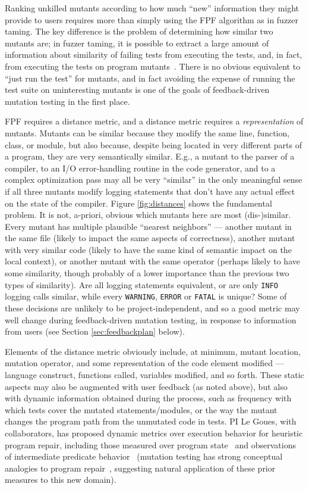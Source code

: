 Ranking unkilled mutants according to how much ``new'' information they might
provide to users requires more than simply using the FPF algorithm as
in fuzzer taming.  The key difference is the problem of determining
how similar two mutants are; in fuzzer taming, it is possible to
extract a large amount of information about similarity of failing
tests from executing the tests, and, in fact, from executing the tests
on program mutants~\cite{PLDI13,distMut}.  There is no obvious
equivalent to
``just run the test'' for mutants, and in fact avoiding the expense of running
the test suite on uninteresting mutants is one of the goals of
feedback-driven mutation testing in the first place.

FPF requires a distance metric, and a distance metric requires a
\emph{representation} of mutants.  Mutants can be similar because they
modify the same line, function, class, or module, but also because,
despite being located in very different parts of a program, they are
very semantically similar.  E.g., a mutant to the parser of a compiler, to
an I/O error-handling routine in the code generator, and to a complex
optimization pass may all be very ``similar'' in the only meaningful
sense if all three mutants modify logging statements that don't have
any actual effect on the state of the compiler.  Figure
\ref{fig:distances} shows the fundamental problem.  It is not,
a-priori, obvious which mutants here are most (dis-)similar.  Every
mutant has multiple plausible ``nearest neighbors'' --- another mutant
in the same file (likely to impact the same aspects of correctness),
another mutant with very similar code (likely to have the same kind of
semantic impact on the local context), or another mutant with the same operator (perhaps
likely to have some similarity, though probably of a lower importance
than the previous two types of similarity).  Are all logging statements
equivalent, or are only {\tt INFO} logging calls similar, while every
{\tt WARNING}, {\tt ERROR} or {\tt FATAL} is unique?  Some of these
decisions are unlikely to be project-independent, and so a good metric
may well change during feedback-driven mutation testing, in response
to information from users (see Section \ref{sec:feedbackplan} below).

Elements of the
distance metric obviously include, at minimum, mutant location, mutation operator, and
some representation of the code element modified --- language
construct, functions called, variables modified, and so forth.  These
static aspects may also be augmented with user feedback (as noted
above), but also with dynamic information obtained during the process,
such as frequency with which tests cover the mutated
statements/modules, or the way the mutant changes the
program path from the unmutated code in tests.  PI Le Goues, with collaborators,
has proposed dynamic metrics over execution behavior for heuristic program repair,
including those measured over program state~\cite{desouza-gecco18,oliveira-ese18} and
observations of intermediate predicate behavior~\cite{Ding2019} (mutation testing
has strong conceptual analogies to program repair~\cite{Weimer2013}, suggesting
natural application of these prior measures to this new domain).


